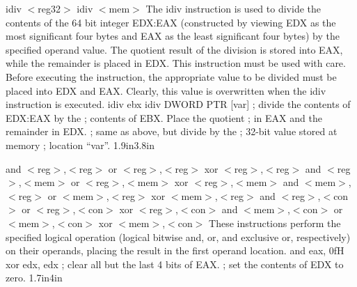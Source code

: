 {idiv $<$reg32$>$\newline
idiv $<$mem$>$}
{The idiv instruction is used to divide the contents of the 64 bit
  integer EDX:EAX (constructed by viewing EDX as the most significant
  four bytes and EAX as the least significant four bytes) by the
  specified operand value. The quotient result of the division is
  stored into EAX, while the remainder is placed in EDX. This
  instruction must be used with care. Before executing the
  instruction, the appropriate value to be divided must be placed into
  EDX and EAX. Clearly, this value is overwritten when the idiv
  instruction is executed.}
{idiv ebx \newline\newline\newline idiv DWORD PTR [var]}
{; divide the contents of EDX:EAX by the \newline
; contents of EBX. Place the quotient \newline
; in EAX and the remainder in EDX.\newline
; same as above, but divide by the \newline
; 32-bit value stored at memory \newline
; location ``var''.}
{1.9in}{3.8in}

{and $<$reg$>$,$<$reg$>$ \hspace{0.25in} or $<$reg$>$,$<$reg$>$ \hspace{0.25in} xor $<$reg$>$,$<$reg$>$ \newline
and $<$reg$>$,$<$mem$>$ \hspace{0.25in} or $<$reg$>$,$<$mem$>$ \hspace{0.25in} xor $<$reg$>$,$<$mem$>$ \newline
and $<$mem$>$,$<$reg$>$ \hspace{0.25in} or $<$mem$>$,$<$reg$>$ \hspace{0.25in} xor $<$mem$>$,$<$reg$>$ \newline
and $<$reg$>$,$<$con$>$ \hspace{0.25in} or $<$reg$>$,$<$con$>$ \hspace{0.25in} xor $<$reg$>$,$<$con$>$ \newline
and $<$mem$>$,$<$con$>$ \hspace{0.25in} or $<$mem$>$,$<$con$>$ \hspace{0.25in} xor $<$mem$>$,$<$con$>$}
{These instructions perform the specified logical operation (logical
bitwise and, or, and exclusive or, respectively) on their operands,
placing the result in the first operand location.}
{and eax, 0fH \newline xor edx, edx}
{; clear all but the last 4 bits of EAX. \newline ; set the contents of EDX to zero.}
{1.7in}{4in}

